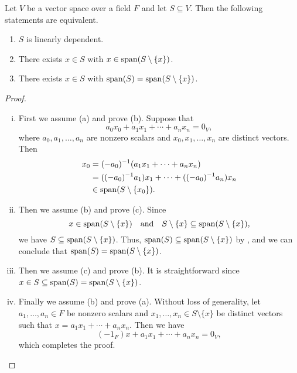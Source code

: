 \begin{theorem}\label{thm:linear-dependence-equivalence}
  Let $V$ be a vector space over a field $F$ and let $S \subseteq V$.
  Then the following statements are equivalent.
  \begin{enumerate}
    \item $S$ is linearly dependent.
    \item There exists $x \in S$ with $x \in \operatorname{span}(S \setminus \{x\})$.
    \item There exists $x \in S$ with $\operatorname{span}(S) = \operatorname{span}(S \setminus \{x\})$.
  \end{enumerate}
\end{theorem}
\begin{proof}
  \leavevmode
  \begin{enumerate}[(i)]
    \item First we assume (a) and prove (b). Suppose that
      \begin{equation*}
        a_0x_0 + a_1x_1 + \cdots + a_nx_n = 0_V,
      \end{equation*}
      where $a_0, a_1, \dots, a_n$ are nonzero scalars and
      $x_0, x_1, \dots, x_n$ are distinct vectors. Then
      \begin{align*}
        x_0
        &= (-a_0)^{-1}(a_1x_1 + \cdots + a_nx_n) \\
        &= ((-a_0)^{-1}a_1)x_1 + \cdots + ((-a_0)^{-1}a_n)x_n \\
        &\in \operatorname{span}(S \setminus \{x_0\}).
      \end{align*}
    \item Then we assume (b) and prove (c). Since
      \begin{equation*}
        x \in \operatorname{span}(S \setminus \{x\})
        \quad \text{and} \quad
        S \setminus \{x\} \subseteq \operatorname{span}(S \setminus \{x\}),
      \end{equation*}
      we have $S \subseteq \operatorname{span}(S \setminus \{x\})$.
      Thus, $\operatorname{span}(S) \subseteq \operatorname{span}(S \setminus \{x\})$ by ,
      and we can conclude that $\operatorname{span}(S) = \operatorname{span}(S \setminus \{x\})$.
    \item Then we assume (c) and prove (b). It is straightforward
      since $x \in S \subseteq \operatorname{span}(S) = \operatorname{span}(S \setminus \{x\})$.
    \item Finally we assume (b) and prove (a).
      Without loss of generality, let $a_1, \dots, a_n \in F$ be nonzero
      scalars and $x_1, \dots, x_n \in S \setminus \{x\}$ be distinct vectors
      such that $x = a_1x_1 + \cdots + a_nx_n$. Then we have
      \begin{equation*}
        (-1_F)x + a_1x_1 + \cdots + a_nx_n = 0_V,
      \end{equation*}
      which completes the proof. \qedhere
  \end{enumerate}
\end{proof}

